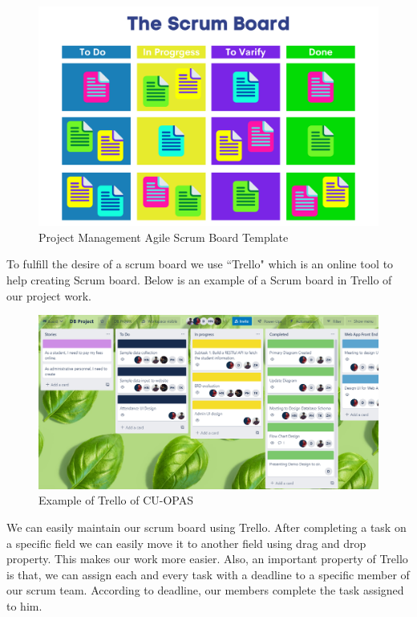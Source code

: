 \begin{enumerate}
\begin{figure}[H]
    \centering
    \includegraphics[width=1\textwidth]{images/scrum_board}
    \caption{Project Management Agile Scrum Board Template}
    \label{fig:scrum_board}
\end{figure}


To fulfill the desire of a scrum board we use ``Trello" which is an online tool to help creating Scrum board. Below is an example of a Scrum board in Trello of our project work.

\begin{figure}[H]
    \centering
    \includegraphics[width=1\textwidth]{images/trello}
    \caption{Example of Trello of CU-OPAS}
    \label{fig:trello}
\end{figure}

We can easily maintain our scrum board using Trello. After completing a task on a specific field we can easily move it to another field using drag and drop property. This makes our work more easier. Also, an important property of Trello is that, we can assign each and every task with a deadline to a specific member of our scrum team. According to deadline, our members complete the task assigned to him.



\end{enumerate}

